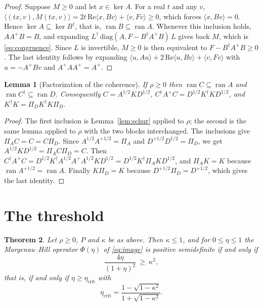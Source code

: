 \documentclass[11pt,a4paper]{article}
\newtheorem{theorem}{Theorem}
\newtheorem{lemma}[theorem]{Lemma}
\theoremstyle{definition}
\theoremstyle{plain}
\DeclareMathOperator{\ran}{ran}
\newcommand{\etac}{\eta_{\mathrm{crit}}}
\begin{document}
\begin{proof}
Suppose $M\ge0$ and let $x\in\ker A$. For a real $t$ and any $v$,
$\langle(tx,v),M(tx,v)\rangle=2t\,\mathrm{Re}\langle x,Bv\rangle+\langle v,Fv\rangle\ge0$,
which forces $\langle x,Bv\rangle=0$. Hence $\ker A\subseteq\ker B^\dagger$, that
is, $\ran B\subseteq\ran A$. Whenever this inclusion holds, $AA^+B=B$, and
expanding $L^\dagger\,\mathrm{diag}(A,F-B^\dagger A^+B)\,L$ gives back $M$, which
is \eqref{eq:congruence}. Since $L$ is invertible, $M\ge0$ is then equivalent
to $F-B^\dagger A^+B\ge0$. The last identity follows by expanding
$\langle u,Au\rangle+2\,\mathrm{Re}\langle u,Bv\rangle+\langle v,Fv\rangle$ with
$u=-A^+Bv$ and $A^+AA^+=A^+$.
\end{proof}

\begin{lemma}[Factorization of the coherence]\label{lem:factor}
If $\rho\ge0$ then $\ran C\subseteq\ran A$ and $\ran C^\dagger\subseteq\ran D$.
Consequently $C=A^{1/2}KD^{1/2}$, $C^\dagger A^+C=D^{1/2}K^\dagger KD^{1/2}$, and
$K^\dagger K=\Pi_DK^\dagger K\Pi_D$.
\end{lemma}

\begin{proof}
The first inclusion is Lemma~\ref{lem:schur} applied to $\rho$; the second is
the same lemma applied to $\rho$ with the two blocks interchanged. The
inclusions give $\Pi_AC=C=C\Pi_D$. Since $A^{1/2}A^{+1/2}=\Pi_A$ and
$D^{+1/2}D^{1/2}=\Pi_D$, we get $A^{1/2}KD^{1/2}=\Pi_AC\Pi_D=C$. Then
$C^\dagger A^+C=D^{1/2}K^\dagger A^{1/2}A^+A^{1/2}KD^{1/2}=D^{1/2}K^\dagger\Pi_AKD^{1/2}$,
and $\Pi_AK=K$ because $\ran A^{+1/2}=\ran A$. Finally $K\Pi_D=K$ because
$D^{+1/2}\Pi_D=D^{+1/2}$, which gives the last identity.
\end{proof}

\section{The threshold}\label{sec:main}
\begin{theorem}\label{thm:main}
Let $\rho\ge0$, $P$ and $\kappa$ be as above. Then $\kappa\le1$, and for
$0\le\eta\le1$ the Margenau--Hill operator $\Phi(\eta)$ of \eqref{eq:image} is
positive semidefinite if and only if
\begin{equation}\label{eq:criterion}
\frac{4\eta}{(1+\eta)^2}\ \ge\ \kappa^2,
\end{equation}
that is, if and only if $\eta\ge\etac$ with
\[
\etac=\frac{1-\sqrt{1-\kappa^2}}{1+\sqrt{1-\kappa^2}}.
\]
\end{theorem}
\end{document}
